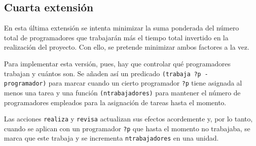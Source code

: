
\subsection{Cuarta extensión} \label{sec:mod-ext4}

En esta última extensión se intenta minimizar la suma ponderada del número total de programadores que trabajarán más el tiempo total invertido en la realización del proyecto. Con ello, se pretende minimizar ambos factores a la vez.

Para implementar esta versión, pues, hay que controlar qué programadores 
trabajan y cuántos son. Se añaden así un predicado 
\texttt{(trabaja ?p - programador)} para marcar cuando un cierto programador 
\texttt{?p} tiene asignada al menos una tarea y una función 
\texttt{(ntrabajadores)} para mantener el número de programadores empleados 
para la asignación de tareas hasta el momento. 

Las acciones \texttt{realiza} y \texttt{revisa} actualizan sus efectos 
acordemente y, por lo tanto, cuando se aplican con un programador \texttt{?p} 
que hasta el momento no trabajaba, se marca que este trabaja y se incrementa 
\texttt{ntrabajadores} en una unidad.




